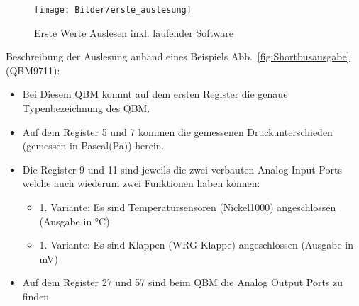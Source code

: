 \begin{figure}[H]
	\centering
	\texttt{[image: Bilder/erste\_auslesung]}
	\caption{Erste Werte Auslesen inkl. laufender Software} 
	\label{fig:ersteauslesung}
\end{figure}

Beschreibung der Auslesung anhand eines Beispiels Abb.~\ref{fig:Shortbusausgabe} (QBM9711):
\begin{itemize}
	\item Bei Diesem QBM kommt auf dem ersten Register die genaue Typenbezeichnung des QBM.  
	\item Auf dem Register 5 und 7 kommen die gemessenen Druckunterschieden (gemessen in Pascal(Pa)) herein. 
	\item Die Register 9 und 11 sind jeweils die zwei verbauten Analog Input Ports welche auch wiederum zwei Funktionen haben können:
	\begin{itemize}
		\item 1. Variante: Es sind Temperatursensoren (\zB Nickel1000) angeschlossen (Ausgabe in °C)
		\item 1. Variante: Es sind Klappen (\zB WRG-Klappe) angeschlossen (Ausgabe in mV)
	\end{itemize}
	\item Auf dem Register 27 und 57 sind beim QBM die Analog Output Ports zu finden
	
	\cite[vgl.][]{siemens:2021}
\end{itemize} 
 